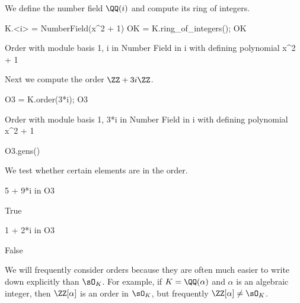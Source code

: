 We define the number field $\QQ(i)$ and compute its
ring of integers.
\begin{sagecode}
\begin{sagecell}
K.<i> = NumberField(x^2 + 1)
OK = K.ring_of_integers(); OK
\end{sagecell}
\begin{sageout}
Order with module basis 1, i in Number Field in i with
defining polynomial x^2 + 1
\end{sageout}
\end{sagecode}

\noindent Next we compute the order $\ZZ + 3i \ZZ$.
\begin{sagecode}
\begin{sagecell}
O3 = K.order(3*i); O3
\end{sagecell}
\begin{sageout}
Order with module basis 1, 3*i in Number Field in i with
defining polynomial x^2 + 1
\end{sageout}
\begin{sagecell}
O3.gens()
\end{sagecell}
\begin{sageout}
[1, 3*i]
\end{sageout}
\end{sagecode}


\noindent We test whether certain elements are in the order.
\begin{sagecode}
\begin{sagecell}
5 + 9*i in O3
\end{sagecell}
\begin{sageout}
True
\end{sageout}
\begin{sagecell}
1 + 2*i in O3
\end{sagecell}
\begin{sageout}
False
\end{sageout}
\end{sagecode}


We will frequently consider orders because they are often much easier
to write down explicitly than $\sO_K$.  For example, if $K=\QQ(\alpha)$
and $\alpha$ is an algebraic integer, then $\ZZ[\alpha]$ is an order in
$\sO_K$, but frequently $\ZZ[\alpha]\neq \sO_K$.

